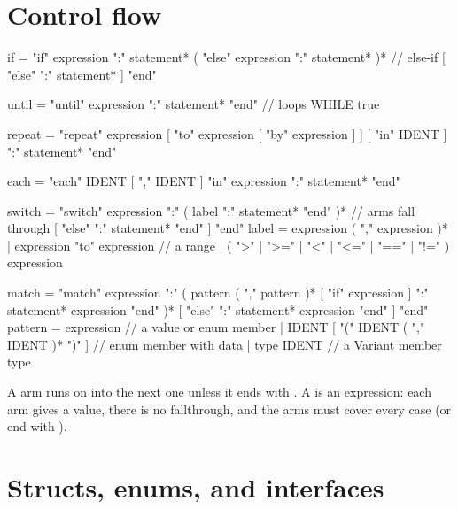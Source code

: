 \section*{Control flow}

\begin{shell}
if          = "if" expression ":" statement*
              ( "else" expression ":" statement* )*     // else-if
              [ "else" ":" statement* ]
              "end"

until       = "until" expression ":" statement* "end"   // loops WHILE true

repeat      = "repeat" expression [ "to" expression [ "by" expression ] ]
                  [ "in" IDENT ] ":"
                  statement*
              "end"

each        = "each" IDENT [ "," IDENT ] "in" expression ":"
                  statement*
              "end"

switch      = "switch" expression ":"
                  ( label ":" statement* "end" )*       // arms fall through
                  [ "else" ":" statement* "end" ]
              "end"
label       = expression ( "," expression )*
            | expression "to" expression               // a range
            | ( ">" | ">=" | "<" | "<=" | "==" | "!=" ) expression

match       = "match" expression ":"
                  ( pattern ( "," pattern )* [ "if" expression ] ":"
                        statement* expression "end" )*
                  [ "else" ":" statement* expression "end" ]
              "end"
pattern     = expression                       // a value or enum member
            | IDENT [ "(" IDENT ( "," IDENT )* ")" ]   // enum member with data
            | type IDENT                       // a Variant member type
\end{shell}

\noindent A  arm runs on into the next one unless it ends with
. A  is an expression: each arm gives a value, there is
no fallthrough, and the arms must cover every case (or end with ).

\section*{Structs, enums, and interfaces}

